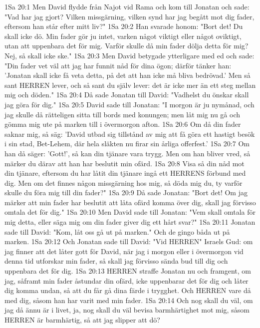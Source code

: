 1Sa 20:1  Men David flydde från Najot vid Rama och kom till Jonatan och sade: "Vad har jag gjort? Vilken missgärning, vilken synd har jag begått mot dig fader, eftersom han står efter mitt liv?"
1Sa 20:2  Han svarade honom: "Bort det! Du skall icke dö. Min fader gör ju intet, varken något viktigt eller något oviktigt, utan att uppenbara det för mig. Varför skulle då min fader dölja detta för mig? Nej, så skall icke ske."
1Sa 20:3  Men David betygade ytterligare med ed och sade: "Din fader vet väl att jag har funnit nåd för dina ögon; därför tänker han: 'Jonatan skall icke få veta detta, på det att han icke må bliva bedrövad.' Men så sant HERREN lever, och så sant du själv lever: det är icke mer än ett steg mellan mig och döden."
1Sa 20:4  Då sade Jonatan till David: "Vadhelst du önskar skall jag göra för dig."
1Sa 20:5  David sade till Jonatan: "I morgon är ju nymånad, och jag skulle då rätteligen sitta till bords med konungen; men låt mig nu gå och gömma mig ute på marken till i övermorgon afton.
1Sa 20:6  Om då din fader saknar mig, så säg: 'David utbad sig tillstånd av mig att få göra ett hastigt besök i sin stad, Bet-Lehem, där hela släkten nu firar sin årliga offerfest.'
1Sa 20:7  Om han då säger: 'Gott!', så kan din tjänare vara trygg. Men om han bliver vred, så märker du därav att han har beslutit min ofärd.
1Sa 20:8  Visa så din nåd mot din tjänare, eftersom du har låtit din tjänare ingå ett HERRENS förbund med dig. Men om det finnes någon missgärning hos mig, så döda mig du, ty varför skulle du föra mig till din fader?"
1Sa 20:9  Då sade Jonatan: "Bort det! Om jag märker att min fader har beslutit att låta ofärd komma över dig, skall jag förvisso omtala det för dig."
1Sa 20:10  Men David sade till Jonatan: "Vem skall omtala för mig detta, eller säga mig om din fader giver dig ett hårt svar?"
1Sa 20:11  Jonatan sade till David: "Kom, låt oss gå ut på marken." Och de gingo båda ut på marken.
1Sa 20:12  Och Jonatan sade till David: "Vid HERREN" Israels Gud: om jag finner att det låter gott för David, när jag i morgon eller i övermorgon vid denna tid utforskar min fader, så skall jag förvisso sända bud till dig och uppenbara det för dig.
1Sa 20:13  HERREN straffe Jonatan nu och framgent, om jag, såframt min fader åstundar din ofärd, icke uppenbarar det för dig och låter dig komma undan, så att du får gå dina färde i trygghet. Och HERREN vare då med dig, såsom han har varit med min fader.
1Sa 20:14  Och nog skall du väl, om jag då ännu är i livet, ja, nog skall du väl bevisa barmhärtighet mot mig, såsom HERREN är barmhärtig, så att jag slipper att dö?
